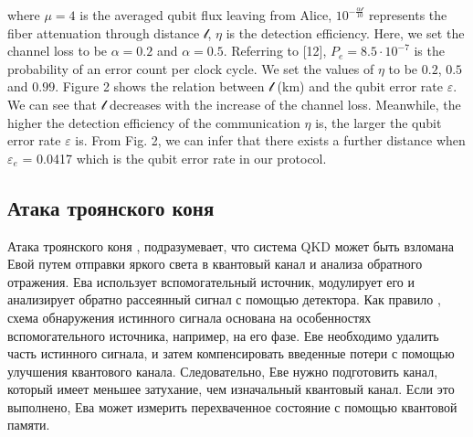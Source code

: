 \documentclass[a4paper,11pt]{article}
\begin{document}
where $\mu = 4$ is the averaged qubit flux leaving from Alice, $10^{- \frac{\alpha \mathcal{l}}{10}}$ represents the fiber attenuation through distance $\mathcal{l}$,
$\eta$ is the detection efficiency. Here, we set the channel loss to be $\alpha = 0.2$ and
$\alpha = 0.5$. Referring to [12], $P_e = 8.5 \cdot 10^{−7}$ is the probability of an error count per clock cycle. We set the values of $\eta$ to be $0.2$, $0.5$ and $0.99$.
Figure 2 shows the relation between $\mathcal{l}$ (km) and the qubit error rate $\varepsilon$. We can see that $\mathcal{l}$ decreases with the increase of the channel loss. Meanwhile, the higher the detection efficiency of the communication $\eta$ is, the larger the qubit error rate $\varepsilon$ is. From Fig. 2, we can infer that there exists a further distance when $\varepsilon_e$ = 0.0417 which is the qubit error rate in our protocol.

\cite{base}


\subsection{Атака троянского коня}

Атака троянского коня \cite{trojan,trojan2, trojan4}, подразумевает, что система QKD может быть взломана Евой путем отправки яркого света в квантовый канал и анализа обратного отражения. Ева использует вспомогательный источник, модулирует его и анализирует обратно рассеянный сигнал с помощью детектора. Как правило \cite{trojan}, схема обнаружения истинного сигнала основана на особенностях вспомогательного источника, например, на его фазе. Еве необходимо удалить часть истинного сигнала, и затем компенсировать введенные потери с помощью улучшения квантового канала. Следовательно, Еве нужно подготовить канал, который имеет меньшее затухание, чем изначальный квантовый канал. Если это выполнено, Ева может измерить перехваченное состояние с помощью квантовой памяти.

\begin{figure}[h]
	\label{ris:image1}
\end{figure}
\end{document}
